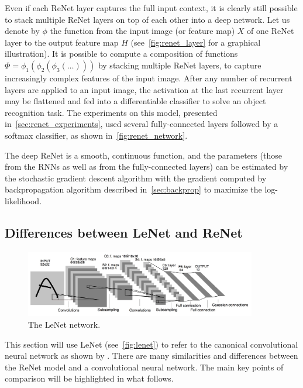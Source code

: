 Even if each ReNet layer captures the full input context, it is clearly still
possible to stack multiple ReNet layers on top of each other into a deep
network. Let us denote by $\phi$ the function from the input image (or feature
map) $X$ of one ReNet layer to the output feature map $H$
(see~\autoref{fig:renet_layer} for a graphical illustration). It is possible
to compute a composition of functions $\Phi = \phi_1(\phi_2(\phi_3(\dots)))$ by
stacking multiple ReNet layers, to capture increasingly complex features of the
input image.  After any number of recurrent layers are applied to an input
image, the activation at the last recurrent layer may be flattened and fed into
a differentiable classifier to solve an object recognition task. The
experiments on this model, presented in~\autoref{sec:renet_experiments}, used
several fully-connected layers followed by a softmax classifier, as shown
in~\autoref{fig:renet_network}.

The deep ReNet is a smooth, continuous function, and the parameters (those from
the RNNs as well as from the fully-connected layers) can be estimated by the
stochastic gradient descent algorithm with the gradient computed by
backpropagation algorithm described in~\autoref{sec:backprop} to maximize the
log-likelihood.

\subsection{Differences between LeNet and ReNet}\label{sec:lenetrenet}

\begin{figure}[t]
    \centering
    \includegraphics[width=0.9\textwidth]{img/renet/lenet5.jpg}
    \caption{The LeNet network.}
    \label{fig:lenet}
    \vspace{-3mm}
\end{figure}

This section will use LeNet (see~\autoref{fig:lenet}) to refer to the canonical
convolutional neural network as shown by \citet{LeCun89}. There are many
similarities and differences between the ReNet model and a convolutional neural
network. The main key points of comparison will be highlighted in what follows.

